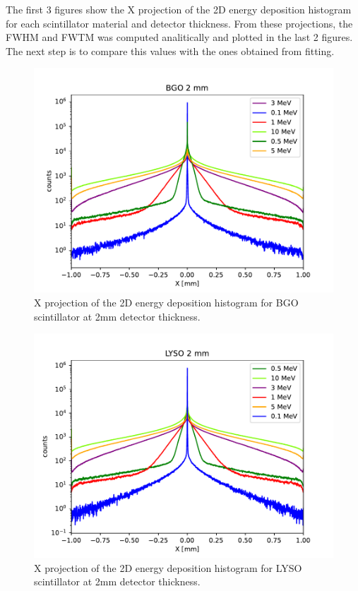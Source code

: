 \documentclass{article}
\begin{document}
The first 3 figures show the X projection of the 2D energy deposition histogram for each scintillator material and detector thickness. From these projections,
the FWHM and FWTM was computed analitically and plotted in the last 2 figures. The next step is to compare this values with the ones obtained from fitting.

\begin{figure}[H]
    \centering
    \includegraphics[width=\linewidth]{images/task4/BGO_2mm.pdf}
    \caption{X projection of the 2D energy deposition histogram for BGO scintillator at 2mm detector thickness.}
\end{figure}
\begin{figure}[H]
    \centering
    \includegraphics[width=\linewidth]{images/task4/LYSO_2mm.pdf}
    \caption{X projection of the 2D energy deposition histogram for LYSO scintillator at 2mm detector thickness.}
\end{figure}
\end{document}
